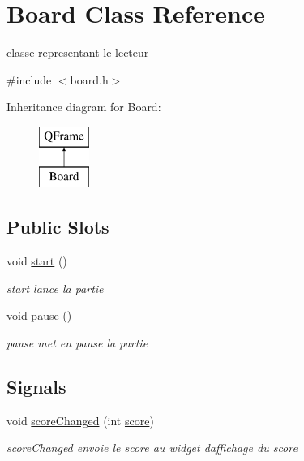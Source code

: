 \hypertarget{class_board}{}\section{Board Class Reference}
\label{class_board}


classe representant le lecteur  




{\ttfamily \#include $<$board.\+h$>$}

Inheritance diagram for Board\+:\begin{figure}[H]
\begin{center}
\leavevmode
\includegraphics[height=2.000000cm]{class_board}
\end{center}
\end{figure}
\subsection*{Public Slots}
\begin{DoxyCompactItemize}
\item 
void \hyperlink{class_board_abb3ae1723d9e7a7a21cda3eb785b984a}{start} ()\hypertarget{class_board_abb3ae1723d9e7a7a21cda3eb785b984a}{}\label{class_board_abb3ae1723d9e7a7a21cda3eb785b984a}

\begin{DoxyCompactList}\small\item\em start lance la partie \end{DoxyCompactList}\item 
void \hyperlink{class_board_a4fa366b8eaa9151e1f16d37da8100f45}{pause} ()\hypertarget{class_board_a4fa366b8eaa9151e1f16d37da8100f45}{}\label{class_board_a4fa366b8eaa9151e1f16d37da8100f45}

\begin{DoxyCompactList}\small\item\em pause met en pause la partie \end{DoxyCompactList}\end{DoxyCompactItemize}
\subsection*{Signals}
\begin{DoxyCompactItemize}
\item 
void \hyperlink{class_board_a53590f45499231a01a8abbc9a95e396d}{score\+Changed} (int \hyperlink{class_board_a7a44f4be355783a0136e42c79733724a}{score})
\begin{DoxyCompactList}\small\item\em score\+Changed envoie le score au widget d\textquotesingle{}affichage du score \end{DoxyCompactList}\end{DoxyCompactItemize}
